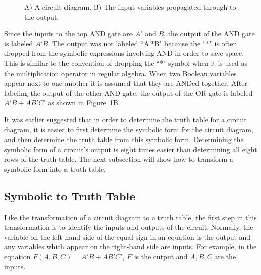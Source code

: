 \begin{figure}[ht]
\caption{A) A circuit diagram.  B) The input variables propagated through
to the output.}
\label{fig:basic}
\end{figure}

Since the inputs to the top AND gate are $A'$ and $B$, the output of the AND
gate is labeled $A'B$.  The output was not labeled ``A'*B" because the
``*" is often dropped from the symbolic expressions involving AND 
in order to save space.  This is similar to the convention 
of dropping the ``*" symbol when it is used
as the multiplication operator in regular algebra.  When two Boolean 
variables appear next to one another it is assumed that they are ANDed together.
After labeling the output of the other AND gate, the output of the OR gate 
is labeled $A'B + AB'C'$ as shown in Figure~\ref{fig:basic}B.

It was earlier suggested that in order to determine the truth table for a
circuit diagram, it is easier to first determine the symbolic form for
the circuit diagram, and then determine the truth table from this symbolic 
form.  Determining the symbolic form of a circuit's output is eight times
easier than determining all eight rows of the truth table.
The next subsection will show how to transform a symbolic 
form into a truth table.

\subsection{Symbolic to Truth Table}

Like the transformation of a circuit diagram to a truth table, the
first step in this transformation is to identify the inputs and outputs 
of the circuit.  Normally, the variable on the left-hand side
of the equal sign in an equation is the output and any variables 
which appear on the 
right-hand side are inputs.  For example, in the equation 
$F(A,B,C) = A'B + AB'C'$, $F$ is the output and $A,B,C$ are the inputs.

